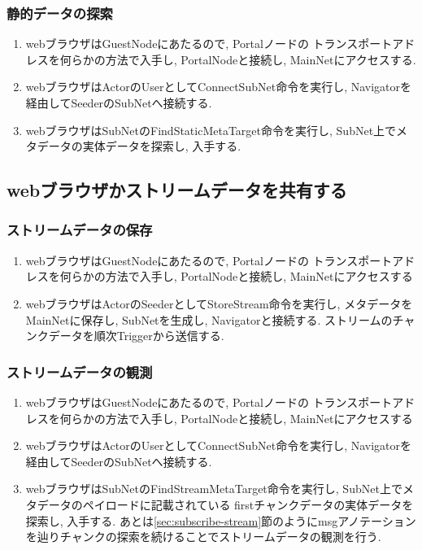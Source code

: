 \documentclass[sotsuron]{jcsie}
\begin{document}
\subsubsection{静的データの探索}
\begin{enumerate}
	\item 
	      webブラウザはGuestNodeにあたるので, Portalノードの
	      トランスポートアドレスを何らかの方法で入手し, PortalNodeと接続し, 
	      MainNetにアクセスする.
	      \\
	\item
	      webブラウザはActorのUserとしてConnectSubNet命令を実行し, 
	      Navigatorを経由してSeederのSubNetへ接続する.
	      \\
	\item 
	      webブラウザはSubNetのFindStaticMetaTarget命令を実行し, 
	      SubNet上でメタデータの実体データを探索し, 入手する.
\end{enumerate}

\subsection{webブラウザかストリームデータを共有する}
\subsubsection{ストリームデータの保存}
\begin{enumerate}
	\item 
	      webブラウザはGuestNodeにあたるので, Portalノードの
	      トランスポートアドレスを何らかの方法で入手し, PortalNodeと接続し, 
	      MainNetにアクセスする
	      \\
	\item
	      webブラウザはActorのSeederとしてStoreStream命令を実行し, 
	      メタデータをMainNetに保存し, SubNetを生成し, Navigatorと接続する.
	      ストリームのチャンクデータを順次Triggerから送信する.	
\end{enumerate}
\subsubsection{ストリームデータの観測}
\begin{enumerate}
	\item 
	      webブラウザはGuestNodeにあたるので, Portalノードの
	      トランスポートアドレスを何らかの方法で入手し, PortalNodeと接続し, 
	      MainNetにアクセスする
	      \\
	\item
	      webブラウザはActorのUserとしてConnectSubNet命令を実行し, 
	      Navigatorを経由してSeederのSubNetへ接続する.
	      \\
	\item 
	      webブラウザはSubNetのFindStreamMetaTarget命令を実行し, 
	      SubNet上でメタデータのペイロードに記載されている
	      firstチャンクデータの実体データを探索し, 入手する.
		  あとは\ref{sec:subscribe-stream}節のようにmsgアノテーション
		  を辿りチャンクの探索を続けることでストリームデータの観測を行う.
\end{enumerate}
\end{document}
